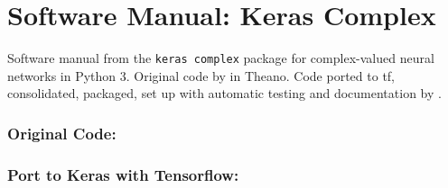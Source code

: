 \chapter{Software Manual: Keras Complex}
\label{section:keras-complex}

Software manual from the \texttt{keras complex} package for complex-valued neural networks in Python 3. Original code by \citet{trabelsi2017deep} in Theano. Code ported to \acl{tf}, consolidated, packaged, set up with automatic testing and documentation by \citet{dramsch2019complexcode}.


\vfill
\subsection*{Original Code:}
{\vfill\hfill\newline{}}
\vfill
\subsection*{Port to Keras with Tensorflow:}
{\vfill\hfill\newline{}}


